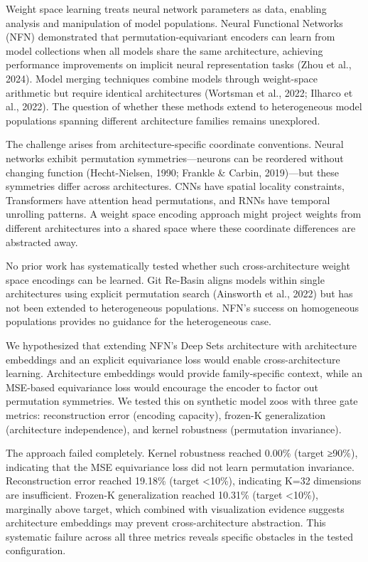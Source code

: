
Weight space learning treats neural network parameters as data, enabling analysis and manipulation of model populations. Neural Functional Networks (NFN) demonstrated that permutation-equivariant encoders can learn from model collections when all models share the same architecture, achieving performance improvements on implicit neural representation tasks (Zhou et al., 2024). Model merging techniques combine models through weight-space arithmetic but require identical architectures (Wortsman et al., 2022; Ilharco et al., 2022). The question of whether these methods extend to heterogeneous model populations spanning different architecture families remains unexplored.

The challenge arises from architecture-specific coordinate conventions. Neural networks exhibit permutation symmetries—neurons can be reordered without changing function (Hecht-Nielsen, 1990; Frankle \& Carbin, 2019)—but these symmetries differ across architectures. CNNs have spatial locality constraints, Transformers have attention head permutations, and RNNs have temporal unrolling patterns. A weight space encoding approach might project weights from different architectures into a shared space where these coordinate differences are abstracted away.

No prior work has systematically tested whether such cross-architecture weight space encodings can be learned. Git Re-Basin aligns models within single architectures using explicit permutation search (Ainsworth et al., 2022) but has not been extended to heterogeneous populations. NFN's success on homogeneous populations provides no guidance for the heterogeneous case.

We hypothesized that extending NFN's Deep Sets architecture with architecture embeddings and an explicit equivariance loss would enable cross-architecture learning. Architecture embeddings would provide family-specific context, while an MSE-based equivariance loss would encourage the encoder to factor out permutation symmetries. We tested this on synthetic model zoos with three gate metrics: reconstruction error (encoding capacity), frozen-K generalization (architecture independence), and kernel robustness (permutation invariance).

The approach failed completely. Kernel robustness reached 0.00\% (target ≥90\%), indicating that the MSE equivariance loss did not learn permutation invariance. Reconstruction error reached 19.18\% (target <10\%), indicating K=32 dimensions are insufficient. Frozen-K generalization reached 10.31\% (target <10\%), marginally above target, which combined with visualization evidence suggests architecture embeddings may prevent cross-architecture abstraction. This systematic failure across all three metrics reveals specific obstacles in the tested configuration.

